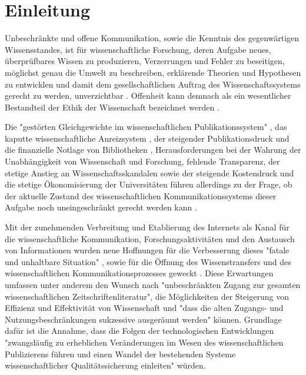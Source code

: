 \chapter{Einleitung}

Unbeschränkte und offene Kommunikation, sowie die Kenntnis des gegenwärtigen Wissensstandes, ist für wissenschaftliche Forschung, deren Aufgabe neues, überprüfbares Wissen zu produzieren, Verzerrungen und Fehler zu beseitigen, möglichst genau die Umwelt zu beschreiben, erklärende Theorien und Hypothesen zu entwicklen und damit dem gesellschaftlichen Auftrag des Wissenschaftssystems gerecht zu werden, unverzichtbar \cite{bbaw_publizieren_2015} \cite{Luescher_2014} \cite{Hanekop_2014} \cite{graefen2007_wissenschaftliche_artikel} \cite{glaeser2006} \cite{Luhmann1998} \cite{gibbons_1994}. Offenheit kann demnach als ein wesentlicher Bestandteil der Ethik der Wissenschaft bezeichnet werden \cite{Peters_2014} \cite{resnik_2005_ethics}.

Die "gestörten Gleichgewichte im wissenschaftlichen Publikationssystem" \cite{cite:0}, das kaputte wissenschaftliche Anreizsystem \cite{osterloh2008anreize}, der steigender Publikationsdruck und die finanzielle Notlage von Bibliotheken \cite{russell_2008_business}, Herausforderungen bei der Wahrung der Unabhängigkeit von Wissenschaft und Forschung, fehlende Transparenz, der stetige Anstieg an Wissenschaftsskandalen \cite{brembs2015open} sowie der steigende Kostendruck und die stetige Ökonomisierung der Universitäten \cite{bauer2006} führen allerdings zu der Frage, ob der aktuelle Zustand des wissenschaftlichen Kommunikationssystems dieser Aufgabe noch uneingeschränkt gerecht werden kann \cite{Schekman_2013}.

Mit der zunehmenden Verbreitung und Etablierung des Internets als Kanal für die wissenschaftliche Kommunikation, Forschungsaktivitäten und den Austausch von Informationen wurden neue Hoffnungen für die Verbesserung dieses "fatale und unhaltbare Situation" \cite{brembs2015open}, sowie für die Öffnung des Wissenstransfers \cite{schulze_2013_open} \cite{albert_2006_open_implications} und des wissenschaftlichen Kommunikationsprozesses geweckt \cite{Hanekop_2014} \cite{EuropeanCommission_sciencepub_2006} \cite{Goodrum_2001} \cite{Lawrence_1999}. Diese Erwartungen umfassen unter anderem den Wunsch nach "unbeschränkten Zugang zur gesamten wissenschaftlichen Zeitschriftenliteratur", die Möglichkeiten der Steigerung von Effizienz und Effektivität von Wissenschaft \cite{Partha_1994_economics_science} und "dass die alten Zugangs- und Nutzungsbeschränkungen sukzessive ausgeräumt werden" \cite{boai_2002} können. Grundlage dafür ist die Annahme, dass die Folgen der technologischen Entwicklungen "zwangsläufig zu erheblichen Veränderungen im Wesen des wissenschaftlichen Publizierens führen und einen Wandel der bestehenden Systeme wissenschaftlicher Qualitätssicherung einleiten" \cite{berliner_erklaerung_2003} würden.

